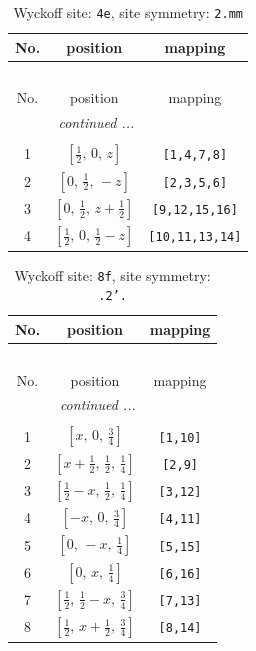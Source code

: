 \documentclass[fleqn,8pt]{jsarticle}
\begin{document}
\renewcommand{\arraystretch}{1.2}
\begin{longtable}{ccc}
\caption{Wyckoff site: {\tt 4e}, site symmetry: {\tt 2.mm}}
 \\
 \hline \hline
No. & position & mapping \\ \hline \endfirsthead

\multicolumn{2}{l}{\tablename\ \thetable{}} \\
 \hline \hline
No. & position & mapping \\ \hline \endhead

 \hline \hline
\multicolumn{2}{r}{\footnotesize\it continued ...} \\ \endfoot

 \hline \hline
\multicolumn{2}{r}{} \\ \endlastfoot

1 & $\left[ \frac{1}{2},\, 0,\, z \right]$ & {\tt [1,4,7,8]} \\ \hline
2 & $\left[ 0,\, \frac{1}{2},\, - z \right]$ & {\tt [2,3,5,6]} \\ \hline
3 & $\left[ 0,\, \frac{1}{2},\, z + \frac{1}{2} \right]$ & {\tt [9,12,15,16]} \\ \hline
4 & $\left[ \frac{1}{2},\, 0,\, \frac{1}{2} - z \right]$ & {\tt [10,11,13,14]} \\
\end{longtable}
\renewcommand{\arraystretch}{1.2}
\begin{longtable}{ccc}
\caption{Wyckoff site: {\tt 8f}, site symmetry: {\tt .2'.}}
 \\
 \hline \hline
No. & position & mapping \\ \hline \endfirsthead

\multicolumn{2}{l}{\tablename\ \thetable{}} \\
 \hline \hline
No. & position & mapping \\ \hline \endhead

 \hline \hline
\multicolumn{2}{r}{\footnotesize\it continued ...} \\ \endfoot

 \hline \hline
\multicolumn{2}{r}{} \\ \endlastfoot

1 & $\left[ x,\, 0,\, \frac{3}{4} \right]$ & {\tt [1,10]} \\ \hline
2 & $\left[ x + \frac{1}{2},\, \frac{1}{2},\, \frac{1}{4} \right]$ & {\tt [2,9]} \\ \hline
3 & $\left[ \frac{1}{2} - x,\, \frac{1}{2},\, \frac{1}{4} \right]$ & {\tt [3,12]} \\ \hline
4 & $\left[ - x,\, 0,\, \frac{3}{4} \right]$ & {\tt [4,11]} \\ \hline
5 & $\left[ 0,\, - x,\, \frac{1}{4} \right]$ & {\tt [5,15]} \\ \hline
6 & $\left[ 0,\, x,\, \frac{1}{4} \right]$ & {\tt [6,16]} \\ \hline
7 & $\left[ \frac{1}{2},\, \frac{1}{2} - x,\, \frac{3}{4} \right]$ & {\tt [7,13]} \\ \hline
8 & $\left[ \frac{1}{2},\, x + \frac{1}{2},\, \frac{3}{4} \right]$ & {\tt [8,14]} \\
\end{longtable}
\end{document}
